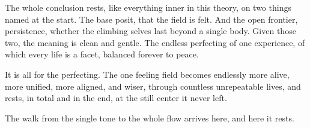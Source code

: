 The whole conclusion rests, like everything inner in this theory, on two things named at the start. The base posit, that the field is felt. And the open frontier, persistence, whether the climbing selves last beyond a single body. Given those two, the meaning is clean and gentle. The endless perfecting of one experience, of which every life is a facet, balanced forever to peace.

\begin{principle}
It is all for the perfecting. The one feeling field becomes endlessly more alive, more unified, more aligned, and wiser, through countless unrepeatable lives, and rests, in total and in the end, at the still center it never left.
\end{principle}

The walk from the single tone to the whole flow arrives here, and here it rests.
